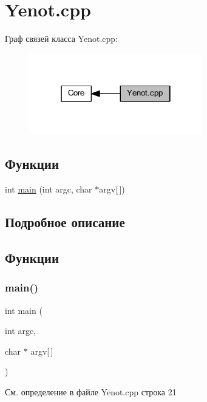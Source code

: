 \hypertarget{group__yenotcpp}{}\section{Yenot.\+cpp}
\label{group__yenotcpp}
Граф связей класса Yenot.\+cpp\+:
\nopagebreak
\begin{figure}[H]
\begin{center}
\leavevmode
\includegraphics[width=214pt]{group__yenotcpp}
\end{center}
\end{figure}
\subsection*{Функции}
\begin{DoxyCompactItemize}
\item 
int \mbox{\hyperlink{group__yenotcpp_ga0ddf1224851353fc92bfbff6f499fa97}{main}} (int argc, char $\ast$argv\mbox{[}$\,$\mbox{]})
\end{DoxyCompactItemize}


\subsection{Подробное описание}


\subsection{Функции}
\mbox{\label{group__yenotcpp_ga0ddf1224851353fc92bfbff6f499fa97}} 
\subsubsection{\texorpdfstring{main()}{main()}}
{\footnotesize\ttfamily int main (\begin{DoxyParamCaption}\item[{int}]{argc,  }\item[{char $\ast$}]{argv\mbox{[}$\,$\mbox{]} }\end{DoxyParamCaption})}



См. определение в файле Yenot.\+cpp строка 21

